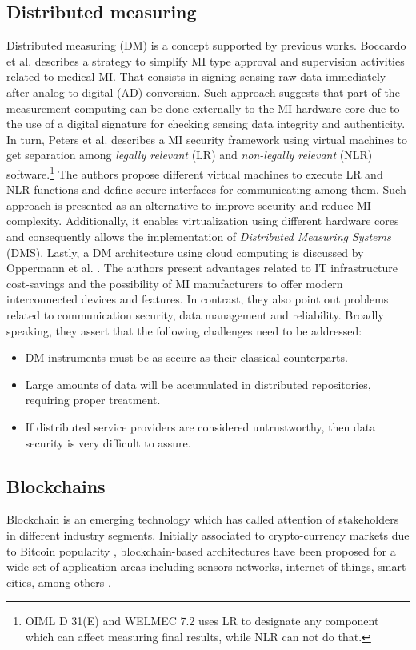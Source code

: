 \documentclass[journal]{IEEEtran} %
\begin{document}
\subsection{Distributed measuring}
Distributed measuring (DM) is a concept supported by previous works. Boccardo et al. \cite{Boccardo2014} describes a strategy to simplify MI type approval and supervision activities related to medical MI. That consists in signing sensing raw data immediately after analog-to-digital (AD) conversion. Such approach suggests that part of the measurement computing can be done externally to the MI hardware core due to the use of a digital signature for checking sensing data integrity and authenticity. In turn, Peters et al. \cite{Peters2015} describes a MI security framework using virtual machines to get separation among \emph{legally relevant} (LR) and \emph{non-legally relevant} (NLR) software.\footnote{OIML D 31(E) and WELMEC 7.2 uses LR to designate any component which can affect measuring final results, while NLR can not do that.} The authors propose different virtual machines to execute LR and NLR functions and define secure interfaces for communicating among them. Such approach is presented as an alternative to improve security and reduce MI complexity. Additionally, it enables virtualization using different hardware cores and consequently allows the implementation of \emph{Distributed Measuring Systems} (DMS). Lastly, a DM architecture using cloud computing is discussed by Oppermann et al. \cite{Oppermann2016}. The authors present advantages related to IT infrastructure cost-savings and the possibility of MI manufacturers to offer modern interconnected devices and features. In contrast, they also point out problems related to communication security, data management and reliability. Broadly speaking, they assert that the following challenges need to be addressed:
 \begin{itemize} 
 \item DM instruments must be as secure as their classical counterparts.
 \item Large amounts of data will be accumulated in distributed repositories, requiring proper treatment.
 \item If distributed service providers are considered untrustworthy, then data security is very difficult to assure. 
 \end{itemize} 

\subsection{Blockchains}
Blockchain is an emerging technology which has called attention of stakeholders in different industry segments. 
Initially associated to crypto-currency markets due to Bitcoin popularity \cite{Zheng2017}, blockchain-based architectures have been proposed for a wide set of application areas including sensors networks, internet of things, smart cities, among others \cite{Zheng2017,Christidis2016,Vukolic2017a}. 
\end{document}
